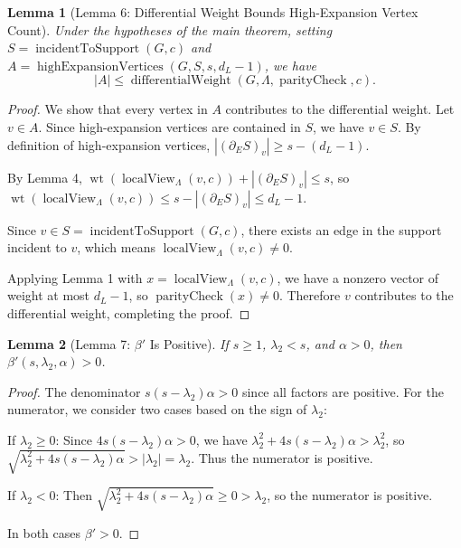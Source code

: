 \documentclass[11pt]{article}
\theoremstyle{plain}
\newtheorem*{lemma}{Lemma}
\theoremstyle{definition}
\theoremstyle{remark}
\begin{document}
\begin{lemma}[Lemma 6: Differential Weight Bounds High-Expansion Vertex Count]
Under the hypotheses of the main theorem, setting $S = \operatorname{incidentToSupport}(G, c)$ and $A = \operatorname{highExpansionVertices}(G, S, s, d_L - 1)$, we have
\[
|A| \leq \operatorname{differentialWeight}(G, \Lambda, \operatorname{parityCheck}, c).
\]
\end{lemma}

\begin{proof}
We show that every vertex in $A$ contributes to the differential weight. Let $v \in A$. Since high-expansion vertices are contained in $S$, we have $v \in S$. By definition of high-expansion vertices, $|(\partial_E S)_v| \geq s - (d_L - 1)$.

By Lemma 4, $\operatorname{wt}(\operatorname{localView}_\Lambda(v, c)) + |(\partial_E S)_v| \leq s$, so $\operatorname{wt}(\operatorname{localView}_\Lambda(v, c)) \leq s - |(\partial_E S)_v| \leq d_L - 1$.

Since $v \in S = \operatorname{incidentToSupport}(G, c)$, there exists an edge in the support incident to $v$, which means $\operatorname{localView}_\Lambda(v, c) \neq 0$.

Applying Lemma 1 with $x = \operatorname{localView}_\Lambda(v, c)$, we have a nonzero vector of weight at most $d_L - 1$, so $\operatorname{parityCheck}(x) \neq 0$. Therefore $v$ contributes to the differential weight, completing the proof.
\end{proof}

\begin{lemma}[Lemma 7: $\beta'$ Is Positive]
If $s \geq 1$, $\lambda_2 < s$, and $\alpha > 0$, then $\beta'(s, \lambda_2, \alpha) > 0$.
\end{lemma}

\begin{proof}
The denominator $s(s - \lambda_2)\alpha > 0$ since all factors are positive. For the numerator, we consider two cases based on the sign of $\lambda_2$:

If $\lambda_2 \geq 0$: Since $4s(s-\lambda_2)\alpha > 0$, we have $\lambda_2^2 + 4s(s-\lambda_2)\alpha > \lambda_2^2$, so $\sqrt{\lambda_2^2 + 4s(s-\lambda_2)\alpha} > |\lambda_2| = \lambda_2$. Thus the numerator is positive.

If $\lambda_2 < 0$: Then $\sqrt{\lambda_2^2 + 4s(s-\lambda_2)\alpha} \geq 0 > \lambda_2$, so the numerator is positive.

In both cases $\beta' > 0$.
\end{proof}
\end{document}
